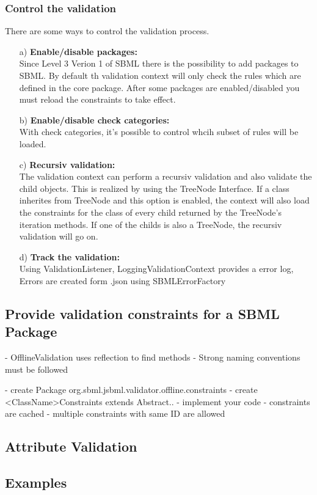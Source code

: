 \subsubsection{Control the validation}
There are some ways to control the validation process.
\begin{itemize}
\item[a)] \textbf{Enable/disable packages:}\\
Since Level 3 Verion 1 of SBML there is the possibility to add packages to SBML. By default th validation context will only check the rules which are defined in the core package. After some packages are enabled/disabled you must reload the constraints to take effect.
\item[b)] \textbf{Enable/disable check categories:}\\
With check categories, it's possible to control whcih subset of rules will be loaded.
\item[c)] \textbf{Recursiv validation:}\\
The validation context can perform a recursiv validation and also validate the child objects. This is realized by using the TreeNode Interface. If a class inherites from TreeNode and this option is enabled, the context will also load the constraints for the class of every child returned by the TreeNode's iteration methods. If one of the childs is also a TreeNode, the recursiv validation will go on.
\item[d)] \textbf{Track the validation:}\\
Using ValidationListener, LoggingValidationContext provides a error log, Errors are created form .json using SBMLErrorFactory
\end{itemize}


\subsection{Provide validation constraints for a SBML Package}
- OfflineValidation uses reflection to find methods
	- Strong naming conventions must be followed
	
- create Package org.sbml.jsbml.validator.offline.constraints
- create <ClassName>Constraints extends Abstract.. 
- implement your code
- constraints are cached
- multiple constraints with same ID are allowed
	
\subsection{Attribute Validation}

\subsection{Examples}